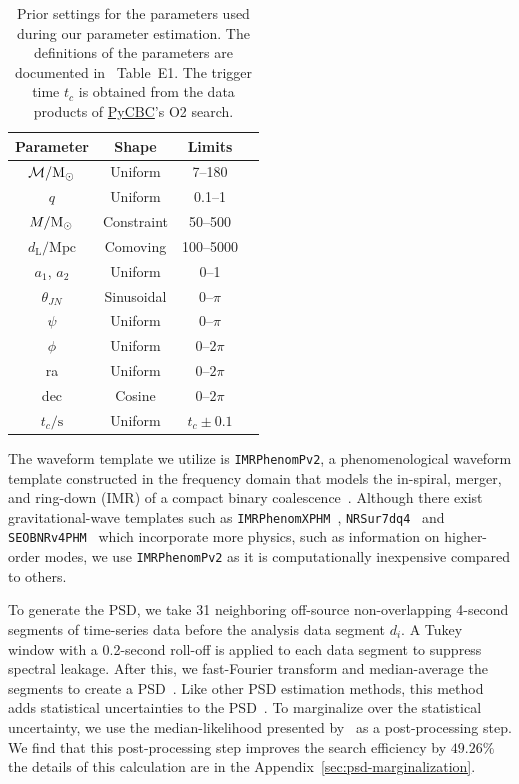 \documentclass[%
 nofootinbib,
 amsmath,amssymb,
 aps,
 twocolumn,
 superscriptaddress
]{revtex4-2}
\newcommand{\imrphenomp}{{\sc \texttt{IMRPhenomPv2}}\xspace}
\newcommand{\seob}{{\sc \texttt{SEOBNRv4PHM}}\xspace}
\newcommand{\nrsur}{{\sc \texttt{NRSur7dq4}}\xspace}
\newcommand{\imrxhm}{{\sc \texttt{IMRPhenomXPHM}}\xspace}
\newcommand{\pycbc}{{\sc \href{https://pycbc.org/}{{PyCBC}}}\xspace}
\newcommand{\mathcmd}[1]{{\sc \relax\ifmmode#1\else $#1$\fi}\xspace}
\newcommand{\msun}{\mathcmd{\text{M}_\odot}}
\begin{document}
\begin{table}
    \centering
    \caption{
    Prior settings for the parameters used during our parameter estimation. The definitions of the parameters are documented in \citet{bilby_gwtc}~Table~E1. The trigger time $t_c$ is obtained from the data products of \pycbc's O2 search. \label{tab:priors}} 
    \begin{tabular}{c c c c}
    \hline
    Parameter & Shape & Limits \\
    \hline
          $\mathcal{M}/\msun$           & Uniform & 7--180  \\
          $q$                           & Uniform & 0.1--1  \\
          $M/\msun$                     & Constraint & 50--500  \\
          $d_\mathrm{L}/\mathrm{Mpc}$   & Comoving & 100--5000  \\
          $a_1$, $a_2$                  & Uniform & 0--1  \\
          $\theta_{JN}$                 & Sinusoidal & 0--$\pi$  \\
          $\psi$                        & Uniform & 0--$\pi$  \\
          $\phi$                        & Uniform & 0--$2\pi$  \\
          ra                            & Uniform & 0--$2\pi$  \\
          dec                           & Cosine & 0--$2\pi$  \\
          $t_c/\mathrm{s}$              & Uniform & $t_c\pm0.1$  \\
    \hline
    \end{tabular}
\end{table}

The waveform template we utilize is \imrphenomp, a phenomenological waveform template constructed in the frequency domain that models the in-spiral, merger, and ring-down (IMR) of a compact binary coalescence~\citep{khan2016frequency}. Although there exist gravitational-wave templates such as \imrxhm~\cite{imrphenompxhm}, \nrsur~\cite{nrsur7dq4} and \seob~\cite{seobnrv4phm} which incorporate more physics, such as information on higher-order modes, we use \imrphenomp as it is computationally inexpensive compared to others.

To generate the PSD, we take 31 neighboring off-source non-overlapping  4-second  segments of time-series data before the analysis data segment $d_i$. A Tukey window with a 0.2-second roll-off is applied to each data segment to suppress spectral leakage. After this, we fast-Fourier transform and median-average the segments to create a PSD~\cite{ligo_psd}. Like other PSD estimation methods, this method adds statistical uncertainties to the PSD~\cite{psd_student_t, chatziioannou2019noise, Biscoveanu:2020:PhRvD}. To marginalize over the statistical uncertainty, we use the median-likelihood presented by~\citet{psd_student_t} as a post-processing step. We find that this post-processing step improves the search efficiency by $49.26\%$ the details of this calculation are in the Appendix~\ref{sec:psd-marginalization}.
\end{document}
